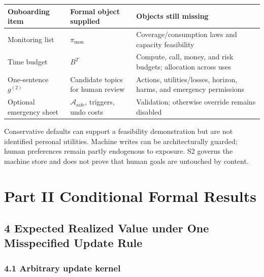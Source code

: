 \documentclass[
  11pt]{article}
\begin{document}
\begin{longtable}[]{@{}
  >{\raggedright\arraybackslash}p{}
  >{\raggedright\arraybackslash}p{}
  >{\raggedright\arraybackslash}p{}@{}}
\toprule\noalign{}
\begin{minipage}[b]{\linewidth}\raggedright
Onboarding item
\end{minipage} & \begin{minipage}[b]{\linewidth}\raggedright
Formal object supplied
\end{minipage} & \begin{minipage}[b]{\linewidth}\raggedright
Objects still missing
\end{minipage} \\
\midrule\noalign{}
\endhead
\bottomrule\noalign{}
\endlastfoot
Monitoring list & \(\pi_{\mathrm{mon}}\) & Coverage/consumption laws and
capacity feasibility \\
Time budget & \(B^T\) & Compute, call, money, and risk budgets;
allocation across uses \\
One-sentence \(g^{(2)}\) & Candidate topics for human review & Actions,
utilities/losses, horizon, harms, and emergency permissions \\
Optional emergency sheet & \(\mathcal A_{\mathrm{safe}}\), triggers,
undo costs & Validation; otherwise override remains disabled \\
\end{longtable}

Conservative defaults can support a feasibility demonstration but are
not identified personal utilities. Machine writes can be architecturally
guarded; human preferences remain partly endogenous to exposure. S2
governs the machine store and does not prove that human goals are
untouched by content.

\section{Part II Conditional Formal
Results}\label{part-ii-conditional-formal-results}

\subsection{4 Expected Realized Value under One Misspecified Update
Rule}\label{expected-realized-value-under-one-misspecified-update-rule}

\subsubsection{4.1 Arbitrary update
kernel}\label{arbitrary-update-kernel}
\end{document}
